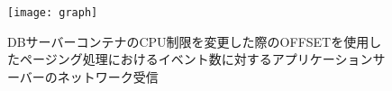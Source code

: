 \documentclass[../../../../../main]{subfiles}
\begin{document}
    \begin{figure}[H]
        \centering
        \texttt{[image: graph]}
        \caption{DBサーバーコンテナのCPU制限を変更した際のOFFSETを使用したページング処理におけるイベント数に対するアプリケーションサーバーのネットワーク受信}
        \label{fig:paging-offset-change-db-cpu-limit-app-net-in-app_4_8192-db_1024}
    \end{figure}
\end{document}
